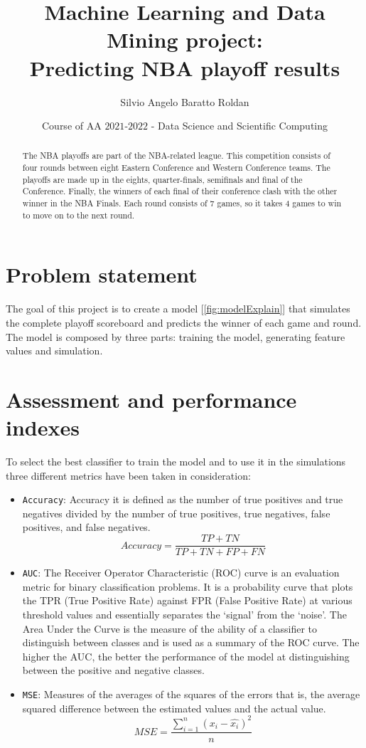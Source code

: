\documentclass{article}
\title{Machine Learning and Data Mining project:\\Predicting NBA playoff results}
\author{Silvio Angelo Baratto Roldan}
\date{Course of AA $2021$-$2022$ - Data Science and Scientific Computing}
\begin{document}
\maketitle

\begin{abstract}
The NBA playoffs are part of the NBA-related league. This competition consists of four rounds between eight Eastern Conference and Western Conference teams. The playoffs are made up in the eights, quarter-finals, semifinals and final of the Conference. Finally, the winners of each final of their conference clash with the other winner in the NBA Finals. Each round consists of 7 games, so it takes 4 games to win to move on to the next round.
\end{abstract}
\section{Problem statement}
\label{section: ProblemStatement}
The goal of this project is to create a model [\ref{fig:modelExplain}] that simulates the complete playoff scoreboard and predicts the winner of each game and round. The model is composed by three parts: training the model, generating feature values and simulation.
\section{Assessment and performance indexes}
\label{section: AssesmentPerformanceIndexes}
To select the best classifier to train the model and to use it in the simulations three different metrics have been taken in consideration:
\begin{itemize}
\item{\texttt{Accuracy}}: Accuracy it is defined as the number of true positives and true negatives divided by the number of true positives, true negatives, false positives, and false negatives.
\begin{equation}
Accuracy = \dfrac{TP + TN}{TP + TN + FP + FN}
\end{equation}
\item{\texttt{AUC}}: The Receiver Operator Characteristic (ROC) curve is an evaluation metric for binary classification problems. It is a probability curve that plots the TPR (True Positive Rate) against FPR (False Positive Rate) at various threshold values and essentially separates the ‘signal’ from the ‘noise’. The Area Under the Curve is the measure of the ability of a classifier to distinguish between classes and is used as a summary of the ROC curve. The higher the AUC, the better the performance of the model at distinguishing between the positive and negative classes.
\item{\texttt{MSE}}: Measures of the averages of the squares of the errors that is, the average squared difference between the estimated values and the actual value.
\begin{equation}
MSE = \dfrac{\sum_{i = 1}^n (x_i - \hat{x_i})^2}{n}
\end{equation}
\end{itemize}
\end{document}
